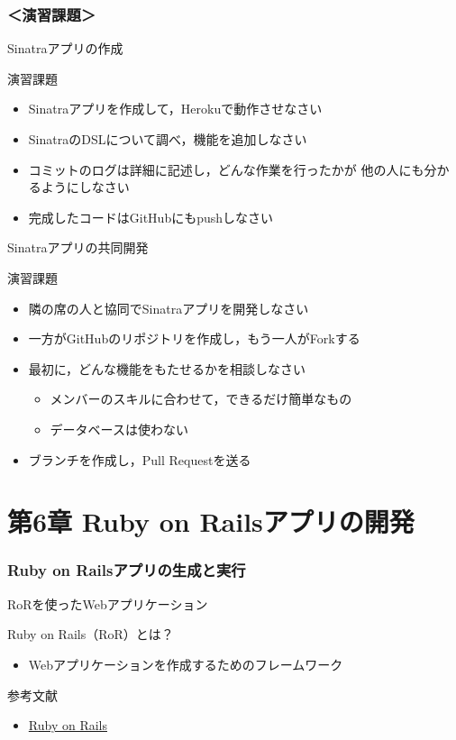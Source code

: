 \documentclass[t, aspectratio=169]{beamer}
\begin{document}
\section{＜演習課題＞}
\label{sec-5-3}
\begin{frame}[label=sec-5-3-1]{Sinatraアプリの作成}
\begin{block}{演習課題}
\begin{itemize}
\item Sinatraアプリを作成して，Herokuで動作させなさい
\item SinatraのDSLについて調べ，機能を追加しなさい
\item コミットのログは詳細に記述し，どんな作業を行ったかが
他の人にも分かるようにしなさい
\item 完成したコードはGitHubにもpushしなさい
\end{itemize}
\end{block}
\end{frame}
\begin{frame}[label=sec-5-3-2]{Sinatraアプリの共同開発}
\begin{block}{演習課題}
\begin{itemize}
\item 隣の席の人と協同でSinatraアプリを開発しなさい
\item 一方がGitHubのリポジトリを作成し，もう一人がForkする
\item 最初に，どんな機能をもたせるかを相談しなさい
\begin{itemize}
\item メンバーのスキルに合わせて，できるだけ簡単なもの
\item データベースは使わない
\end{itemize}
\item ブランチを作成し，Pull Requestを送る
\end{itemize}
\end{block}
\end{frame}

\part{第6章 Ruby on Railsアプリの開発}
\label{sec-6}
\section{Ruby on Railsアプリの生成と実行}
\label{sec-6-1}
\begin{frame}[label=sec-6-1-1]{RoRを使ったWebアプリケーション}
\begin{block}{Ruby on Rails（RoR）とは？}
\begin{itemize}
\item Webアプリケーションを作成するためのフレームワーク
\end{itemize}
\end{block}
\begin{block}{参考文献}
\begin{itemize}
\item \href{http://rubyonrails.org/}{Ruby on Rails}
\end{itemize}
\end{block}
\end{frame}
\end{document}

